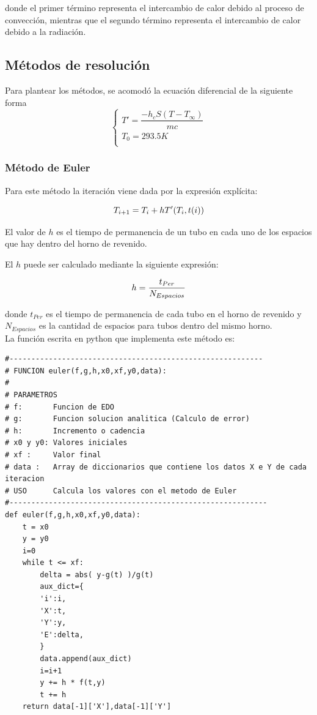 \documentclass[10pt,a4paper]{article}
\begin{document}
donde el primer término representa el intercambio de calor debido al proceso de convección, mientras que el segundo término representa el intercambio de calor debido a la radiación.

\subsection{Métodos de resolución}
Para plantear los métodos, se acomodó la ecuación diferencial de la siguiente forma\\

\begin{equation}
\left\{ 
\begin{array}{ll}
T'=\dfrac{-h_{c}S(T-T_{\infty})}{mc}\\[10pt]
T_{0}= 293.5 K \\[10pt]
\end{array} \right.
\end{equation}

\subsubsection{Método de Euler}
Para este método la iteración viene dada por la expresión explícita:

\begin{equation}
\notag T_{i+1}=T_{i}+hT'(T_{i},t(i))
\end{equation}

El valor de $h$ es el tiempo de permanencia de un tubo en cada uno de los espacios que hay dentro del horno de revenido.

El $h$ puede ser calculado mediante la siguiente expresión:

\begin{equation}
\notag h = \dfrac{t_{Per}}{N_{Espacios}}\\[10pt]
\end{equation}

donde $t_{Per}$ es el tiempo de permanencia de cada tubo en el horno de revenido y $N_{Espacios}$ es la cantidad de espacios para tubos dentro del mismo horno.\\

La función escrita en python que implementa este método es:
\begin{verbatim}
#----------------------------------------------------------
# FUNCION euler(f,g,h,x0,xf,y0,data):
#
# PARAMETROS
# f:       Funcion de EDO
# g:       Funcion solucion analitica (Calculo de error)
# h:       Incremento o cadencia
# x0 y y0: Valores iniciales
# xf :     Valor final
# data :   Array de diccionarios que contiene los datos X e Y de cada iteracion
# USO      Calcula los valores con el metodo de Euler
#-----------------------------------------------------------
def euler(f,g,h,x0,xf,y0,data):
    t = x0
    y = y0
    i=0
    while t <= xf:
        delta = abs( y-g(t) )/g(t)
        aux_dict={
        'i':i,
        'X':t,
        'Y':y,
        'E':delta,
        }
        data.append(aux_dict)
        i=i+1
        y += h * f(t,y)
        t += h
    return data[-1]['X'],data[-1]['Y']
\end{verbatim}
\end{document}
